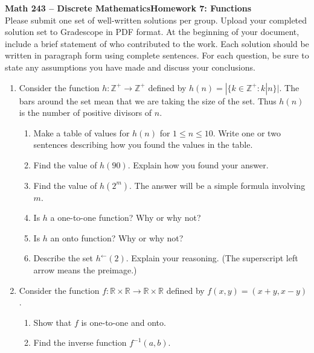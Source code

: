 \documentclass{article}
\newcommand{\R}{\mathbb{R}}
\newcommand{\Z}{\mathbb{Z}}
\begin{document}
\textbf{Math 243 -- Discrete Mathematics}\hfill\textbf{Homework 7: Functions }\\[0.0625in]

Please submit one set of well-written solutions per group.  Upload your completed solution set to Gradescope in PDF format. At the beginning of your document, include a brief statement of who contributed to the work.  Each solution should be written in paragraph form using complete sentences. For each question, be sure to state any assumptions you have made and discuss your conclusions. 

\medskip
\begin{enumerate}

\item Consider the function $h:\mathbb{Z}^+ \to \mathbb{Z}^+$ defined by $h(n)=|\{k\in \Z^+ : k|n\}|$. The bars around the set mean that we are taking the size of the set. Thus $h(n)$ is the number of positive divisors of $n$. 
\begin{enumerate}
\item Make a table of values for $h(n)$ for $1\leq n \leq10$.  Write one or two sentences describing how you found the values in the table. 
\item Find the value of $h(90)$. Explain how you found your answer. 
\item Find the value of $h(2^m)$. The answer will be a simple formula involving $m$.
\item Is $h$ a one-to-one function? Why or why not?
\item Is $h$ an onto function? Why or why not?
\item Describe the set $h^{\leftarrow}(2)$. Explain your reasoning. (The superscript left arrow means the preimage.)
\end{enumerate}

\item Consider the function $f:\R \times \R \to \R \times \R$ defined by $f(x,y)= (x+y,x-y)$. 
\begin{enumerate}
	\item Show that $f$ is one-to-one and onto.
	\item Find the inverse function $f^{-1}(a,b)$.
\end{enumerate} 


\end{enumerate}
\end{document}
